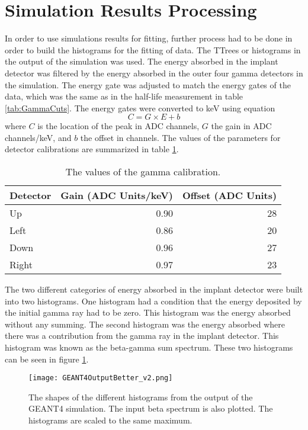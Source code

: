 \documentclass[../MaxHughesThesis.tex]{subfiles}
\begin{document}
\section{Simulation Results Processing}
In order to use simulations results for fitting, further process had to be done in order to build the histograms for the fitting of data.
The TTrees or histograms in the output of the simulation was used.
The energy absorbed in the implant detector was filtered by the energy absorbed in the outer four gamma detectors in the simulation.
The energy gate was adjusted to match the energy gates of the data, which was the same as in the half-life measurement in table \ref{tab:GammaCuts}.
The energy gates were converted to keV using equation
\begin{equation}
        C = G \times E + b
        \label{eq:cal}
\end{equation}
where $C$ is the location of the peak in ADC channels, $G$ the gain in ADC channels/keV, and $b$ the offset in channels.
The values of the parameters for detector calibrations are summarized in table \ref{tab:gammadetcal}.

\begin{table}[!hbt]
        \centering
        \caption{The values of the gamma calibration.}
                \begin{tabular}{lrr}
                Detector & Gain (ADC Units/keV) & Offset (ADC Units) \\ \hline
                Up & 0.90 & 28 \\
                Left & 0.86 & 20 \\
                Down & 0.96 & 27 \\
                Right & 0.97 & 23
                \end{tabular}
                \label{tab:gammadetcal}
\end{table}
The two different categories of energy absorbed in the implant detector were built into two histograms.
One histogram had a condition that the energy deposited by the initial gamma ray had to be zero.
This histogram was the energy absorbed without any summing.
The second histogram was the energy absorbed where there was a contribution from the gamma ray in the implant detector.
This histogram was known as the beta-gamma sum spectrum.
These two histograms can be seen in figure \ref{fig:GEANT4Hists}.
\begin{figure}[!htb]
        \centerline{\texttt{[image: GEANT4OutputBetter\_v2.png]}}
        \caption{The shapes of the different histograms from the output of the GEANT4 simulation.
                 The input beta spectrum is also plotted.
                 The histograms are scaled to the same maximum.}
        \label{fig:GEANT4Hists}
\end{figure}
\end{document}
